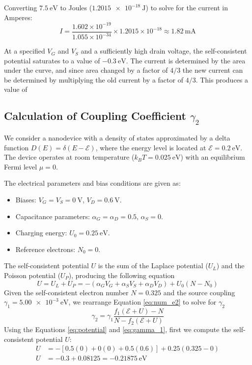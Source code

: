 \documentclass[a4paper, 10pt]{article}
\begin{document}
\noindent Converting $\SI{7.5}{\eV}$ to Joules ($\SI{1.2015e-18}{\joule}$) to solve for the current in Amperes:
\[
    I = \frac{1.602 \times 10^{-19}}{1.055 \times 10^{-34}} \times 1.2015 \times 10^{-18} \approx \SI{1.82}{\milli\ampere}
\]

\noindent At a specified $V_G$ and $V_S$ and a sufficiently high drain voltage, the self-consistent potential saturates to a value of $\SI{-0.3}{\unit{\eV}}$. The current is determined by the area under the curve, and since area changed by a factor of $4/3$ the new current can be determined by multiplying the old current by a factor of $4/3$. This produces a value of 

\subsection{Calculation of Coupling Coefficient $\gamma_2$}

We consider a nanodevice with a density of states approximated by a delta function $D(E) = \delta(E - \mathcal{E})$, where the energy level is located at $\mathcal{E} = \SI{0.2}{\eV}$. The device operates at room temperature ($k_B T = \SI{0.025}{\eV}$) with an equilibrium Fermi level $\mu = 0$.

\noindent The electrical parameters and bias conditions are given as:
\begin{itemize}
    \item Biases: $V_G = V_S = \SI{0}{\volt}$, $V_D = \SI{0.6}{\volt}$.
    \item Capacitance parameters: $\alpha_G = \alpha_D = 0.5$, $\alpha_S = 0$.
    \item Charging energy: $U_0 = \SI{0.25}{\eV}$.
    \item Reference electrons: $N_0 = 0$.
\end{itemize}

\noindent The self-consistent potential $U$ is the sum of the Laplace potential ($U_L$) and the Poisson potential ($U_P$), producing the following equation
\begin{equation}\label{eq:potential}
    U = U_L + U_P = -(\alpha_G V_G + \alpha_S V_S + \alpha_D V_D) + U_0(N - N_0)
\end{equation}
\noindent Given the self-consistent electron number $N = 0.325$ and the source coupling $\gamma_1 = \SI{5.00e-3}{\eV}$, we rearrange Equation \ref{eq:num_e2} to solve for $\gamma_2$
\begin{equation}\label{eq:gamma_1}
    \gamma_2 = \gamma_1 \frac{f_1(\mathcal{E} + U) - N}{N - f_2(\mathcal{E} + U)}
\end{equation}
Using the Equations \ref{eq:potential} and \ref{eq:gamma_1}, first we compute the self-consistent potential $U$:
\begin{align*}
    U &= -[0.5(0) + 0(0) + 0.5(0.6)] + 0.25(0.325 - 0) \\
    U &= -0.3 + 0.08125 = \SI{-0.21875}{\eV}
\end{align*}
\end{document}
